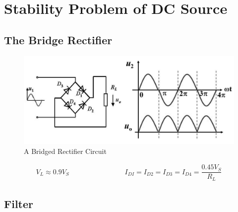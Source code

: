 \chapter{Stability Problem of DC Source}

\section{The Bridge Rectifier}

\begin{figure}[H]
  \centering
  \includegraphics[width=0.9\linewidth]{figures/BridgedRectifierCircuit}
  \caption{A Bridged Rectifier Circuit}
\end{figure}

\begin{equation*}
  \begin{aligned}
    V_L \approx 0.9 V_S \quad\quad \quad\quad \quad\quad \quad\quad  I_{DI} = I_{D2} = I_{D3} = I_{D4} = \dfrac{0.45 V_S}{R_L} 
  \end{aligned}
\end{equation*}

\section{Filter}

